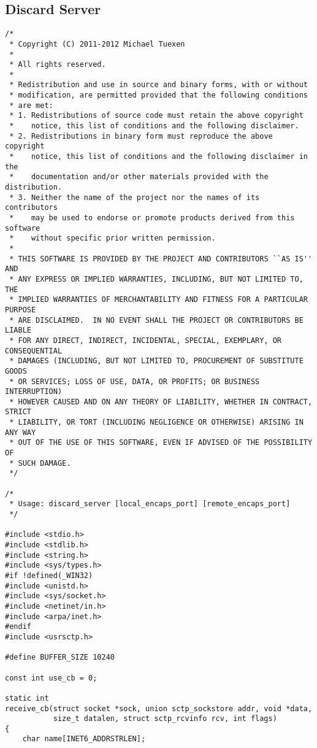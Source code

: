 \documentclass[a4paper]{article}
\begin{document}
\subsection{Discard Server}\label{server}
\begin{verbatim}
/*
 * Copyright (C) 2011-2012 Michael Tuexen
 *
 * All rights reserved.
 *
 * Redistribution and use in source and binary forms, with or without
 * modification, are permitted provided that the following conditions
 * are met:
 * 1. Redistributions of source code must retain the above copyright
 *    notice, this list of conditions and the following disclaimer.
 * 2. Redistributions in binary form must reproduce the above copyright
 *    notice, this list of conditions and the following disclaimer in the
 *    documentation and/or other materials provided with the distribution.
 * 3. Neither the name of the project nor the names of its contributors
 *    may be used to endorse or promote products derived from this software
 *    without specific prior written permission.
 *
 * THIS SOFTWARE IS PROVIDED BY THE PROJECT AND CONTRIBUTORS ``AS IS'' AND
 * ANY EXPRESS OR IMPLIED WARRANTIES, INCLUDING, BUT NOT LIMITED TO, THE
 * IMPLIED WARRANTIES OF MERCHANTABILITY AND FITNESS FOR A PARTICULAR PURPOSE
 * ARE DISCLAIMED.	IN NO EVENT SHALL THE PROJECT OR CONTRIBUTORS BE LIABLE
 * FOR ANY DIRECT, INDIRECT, INCIDENTAL, SPECIAL, EXEMPLARY, OR CONSEQUENTIAL
 * DAMAGES (INCLUDING, BUT NOT LIMITED TO, PROCUREMENT OF SUBSTITUTE GOODS
 * OR SERVICES; LOSS OF USE, DATA, OR PROFITS; OR BUSINESS INTERRUPTION)
 * HOWEVER CAUSED AND ON ANY THEORY OF LIABILITY, WHETHER IN CONTRACT, STRICT
 * LIABILITY, OR TORT (INCLUDING NEGLIGENCE OR OTHERWISE) ARISING IN ANY WAY
 * OUT OF THE USE OF THIS SOFTWARE, EVEN IF ADVISED OF THE POSSIBILITY OF
 * SUCH DAMAGE.
 */

/*
 * Usage: discard_server [local_encaps_port] [remote_encaps_port]
 */

#include <stdio.h>
#include <stdlib.h>
#include <string.h>
#include <sys/types.h>
#if !defined(_WIN32)
#include <unistd.h>
#include <sys/socket.h>
#include <netinet/in.h>
#include <arpa/inet.h>
#endif
#include <usrsctp.h>

#define BUFFER_SIZE 10240

const int use_cb = 0;

static int
receive_cb(struct socket *sock, union sctp_sockstore addr, void *data,
           size_t datalen, struct sctp_rcvinfo rcv, int flags)
{
    char name[INET6_ADDRSTRLEN];


\end{verbatim}
\end{document}
